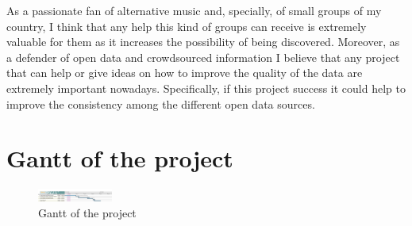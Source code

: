 \documentclass[paper=a4,fontsize=11pt]{scrartcl}
\numberwithin{equation}{section}		%
\numberwithin{figure}{section}			%
\numberwithin{table}{section}				%
\begin{document}
As a passionate fan of alternative music and, specially, of small groups of my country, I think that any help this kind of groups can receive is extremely valuable for them as it increases the possibility of being discovered. 
Moreover, as a defender of open data and crowdsourced information I believe that any project that can help or give ideas on how to improve the quality of the data are extremely important nowadays. 
Specifically, if this project success it could help to improve the consistency among the different open data sources.

{\tiny\printbibliography}

\appendix
\section{Gantt of the project}
\begin{figure}[ht]
    \centering
    \includegraphics[angle=90,width=0.22\textwidth]{project_gantt.png}
    \caption{Gantt of the project}
\end{figure}
\end{document}
